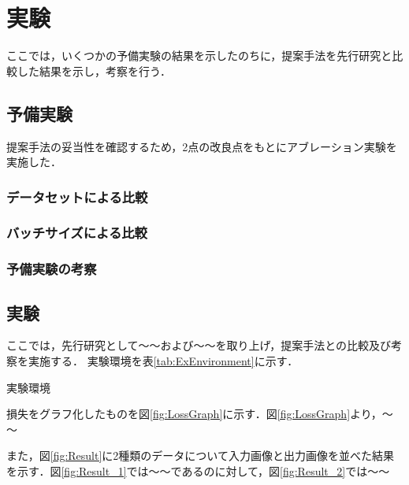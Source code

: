 \chapter{実験}\label{sec:Experiments}
ここでは，いくつかの予備実験の結果を示したのちに，提案手法を先行研究と比較した結果を示し，考察を行う．

\section{予備実験}\label{sec:PreExperiments}
提案手法の妥当性を確認するため，2点の改良点をもとにアブレーション実験を実施した．

\subsection{データセットによる比較}\label{sec:PreEx_Dataset}

\subsection{バッチサイズによる比較}\label{sec:PreEx_Batchsize}

\subsection{予備実験の考察}\label{sec:PreEx_consideration}

\section{実験}\label{sec:Experiment} %

ここでは，先行研究として～～\cite{Dosovitskiy_2021}および～～\cite{Vaswani_2017}を取り上げ，提案手法との比較及び考察を実施する．
実験環境を表\ref{tab:ExEnvironment}に示す．

\begin{table}[htbp]
    \centering
    \caption{実験環境} %
    \label{tab:ExEnvironment} %
\end{table}

損失をグラフ化したものを図\ref{fig:LossGraph}に示す．図\ref{fig:LossGraph}より，～～

また，図\ref{fig:Result}に2種類のデータについて入力画像と出力画像を並べた結果を示す．図\ref{fig:Result_1}では～～であるのに対して，図\ref{fig:Result_2}では～～

